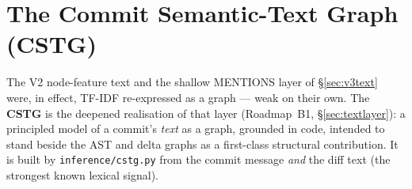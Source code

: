 \documentclass[11pt,a4paper]{article}
\newcommand{\edge}[1]{\textsc{#1}}
\begin{document}
	\section{The Commit Semantic-Text Graph (CSTG)}\label{sec:cstg}
	The V2 node-feature text and the shallow \edge{MENTIONS} layer of \S\ref{sec:v3text}
	were, in effect, TF-IDF re-expressed as a graph --- weak on their own. The
	\textbf{CSTG} is the deepened realisation of that layer (Roadmap~B1,
	\S\ref{sec:textlayer}): a principled model of a commit's \emph{text} as a graph,
	grounded in code, intended to stand beside the AST and delta graphs as a first-class
	structural contribution. It is built by \texttt{inference/cstg.py} from the commit
	message \emph{and} the diff text (the strongest known lexical signal).
\end{document}
